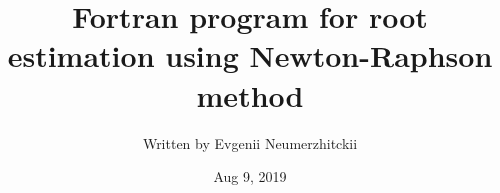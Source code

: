 \documentclass[a4paper,twoside,12pt,hidelinks]{article}
\title{Fortran program for root estimation using Newton-Raphson method}
\author{Written by Evgenii Neumerzhitckii}
\date{Aug 9, 2019}
\begin{document}
\setcounter{secnumdepth}{-1}
\renewcommand{\thepart}{}
\renewcommand{\thesection}{Part \Alph{section}}
\renewcommand{\thesubsection}{\Alph{section}.\arabic{subsection}}
\renewcommand{\partname}{}


\maketitle
\thispagestyle{empty} %

\pagebreak



\pagestyle{fancy}
\fancyhf{}
\renewcommand{\headrulewidth}{0.1pt}
\cfoot{\thepage}



% 

% 


\pagebreak

% 

% 

% 

% 





% 
% 
\end{document}
